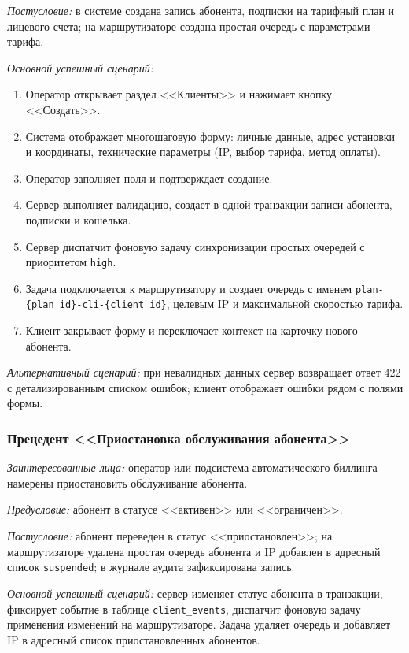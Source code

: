 \emph{Постусловие:} в системе создана запись абонента, подписки на тарифный план и лицевого счета; на маршрутизаторе создана простая очередь с параметрами тарифа.

\emph{Основной успешный сценарий:}
\begin{enumerate}
\item Оператор открывает раздел <<Клиенты>> и нажимает кнопку <<Создать>>.
\item Система отображает многошаговую форму: личные данные, адрес установки и координаты, технические параметры (IP, выбор тарифа, метод оплаты).
\item Оператор заполняет поля и подтверждает создание.
\item Сервер выполняет валидацию, создает в одной транзакции записи абонента, подписки и кошелька.
\item Сервер диспатчит фоновую задачу синхронизации простых очередей с приоритетом \texttt{high}.
\item Задача подключается к маршрутизатору и создает очередь с именем \texttt{plan-\{plan\_id\}-cli-\{client\_id\}}, целевым IP и максимальной скоростью тарифа.
\item Клиент закрывает форму и переключает контекст на карточку нового абонента.
\end{enumerate}

\emph{Альтернативный сценарий:} при невалидных данных сервер возвращает ответ 422 с детализированным списком ошибок; клиент отображает ошибки рядом с полями формы.

\subsubsection{Прецедент <<Приостановка обслуживания абонента>>}

\emph{Заинтересованные лица:} оператор или подсистема автоматического биллинга намерены приостановить обслуживание абонента.

\emph{Предусловие:} абонент в статусе <<активен>> или <<ограничен>>.

\emph{Постусловие:} абонент переведен в статус <<приостановлен>>; на маршрутизаторе удалена простая очередь абонента и IP добавлен в адресный список \texttt{suspended}; в журнале аудита зафиксирована запись.

\emph{Основной успешный сценарий:} сервер изменяет статус абонента в транзакции, фиксирует событие в таблице \texttt{client\_events}, диспатчит фоновую задачу применения изменений на маршрутизаторе. Задача удаляет очередь и добавляет IP в адресный список приостановленных абонентов.

